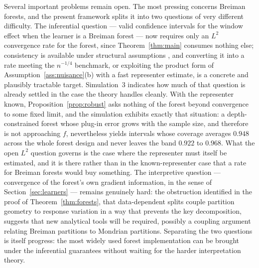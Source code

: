 \documentclass[12pt]{article}
\begin{document}
	Several important problems remain open. The most pressing concerns Breiman
	forests, and the present framework splits it into two questions of very different
	difficulty. The inferential question --- valid confidence intervals for the window
	effect when the learner is a Breiman forest --- now requires only an $L^2$
	convergence rate for the forest, since Theorem~\ref{thm:main} consumes nothing
	else; consistency is available under structural assumptions
	\citep{scornet2015forests}, and converting it into a rate meeting the
	$n^{-1/4}$ benchmark, or exploiting the product form of
	Assumption~\ref{ass:nuisance}(b) with a fast representer estimate, is a concrete
	and plausibly tractable target. Simulation~3 indicates how much of that question
	is already settled in the case the theory handles cleanly. With the representer
	known, Proposition~\ref{prop:robust} asks nothing of the forest beyond
	convergence to some fixed limit, and the simulation exhibits exactly that
	situation: a depth-constrained forest whose plug-in error grows with the sample
	size, and therefore is not approaching $f$, nevertheless yields intervals whose
	coverage averages $0.948$ across the whole forest design and never leaves the
	band $0.922$ to $0.968$. What
	the open $L^2$ question governs is the case where the representer must itself be
	estimated, and it is there rather than in the known-representer case that a rate
	for Breiman forests would buy something. The interpretive question --- convergence of the
	forest's own gradient information, in the sense of
	Section~\ref{sec:learners} --- remains genuinely hard: the obstruction identified
	in the proof of Theorem~\ref{thm:forests}, that data-dependent splits couple
	partition geometry to response variation in a way that prevents the key
	decomposition, suggests that new analytical tools will be required, possibly a
	coupling argument relating Breiman partitions to Mondrian partitions. Separating
	the two questions is itself progress: the most widely used forest implementation
	can be brought under the inferential guarantees without waiting for the harder
	interpretation theory.
	
\end{document}

